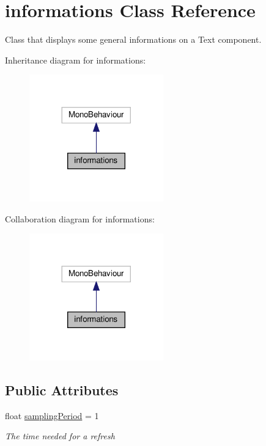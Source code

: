 \hypertarget{classinformations}{}\section{informations Class Reference}
\label{classinformations}


Class that displays some general informations on a Text component.  




Inheritance diagram for informations\+:\nopagebreak
\begin{figure}[H]
\begin{center}
\leavevmode
\includegraphics[width=164pt]{classinformations__inherit__graph}
\end{center}
\end{figure}


Collaboration diagram for informations\+:\nopagebreak
\begin{figure}[H]
\begin{center}
\leavevmode
\includegraphics[width=164pt]{classinformations__coll__graph}
\end{center}
\end{figure}
\subsection*{Public Attributes}
\begin{DoxyCompactItemize}
\item 
float \hyperlink{classinformations_a61499fca827688fff9025d277f5cd589}{sampling\+Period} = 1
\begin{DoxyCompactList}\small\item\em The time needed for a refresh\end{DoxyCompactList}\end{DoxyCompactItemize}
